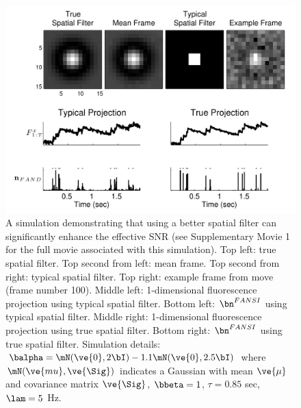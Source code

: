\begin{figure}[H]
\centering \includegraphics[width=.9\linewidth]{../figs/spatial}
\caption{A simulation demonstrating that using a better spatial filter can significantly enhance the effective SNR (see Supplementary Movie 1 for the full movie associated with this simulation).  Top left: true spatial filter.  Top second from left: mean frame.  Top second from right: typical spatial filter.   Top right: example frame from move (frame number 100).  Middle left: 1-dimensional fluorescence projection using typical spatial filter.  Bottom left: $\bn^{FANSI}$ using typical spatial filter.  Middle right: 1-dimensional fluorescence projection using true spatial filter.  Bottom right: $\bn^{FANSI}$ using true spatial filter. Simulation details: $\balpha=\mN(\ve{0},2 \bI)-1.1 \mN(\ve{0},2.5 \bI)$ where $\mN(\ve{mu},\ve{\Sig})$ indicates a Gaussian with mean $\ve{\mu}$ and covariance matrix $\ve{\Sig}$, $\bbeta=1$, $\tau=0.85$ sec, $\lam=5$ Hz.} \label{fig:spatial} \end{figure} 